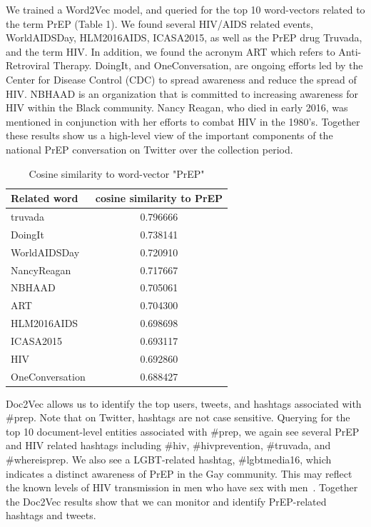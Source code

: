 \documentclass{sig-alternate-05-2015}
\begin{document}
We trained a Word2Vec model, and queried for the top 10 word-vectors related to the term PrEP (Table 1). We found several HIV/AIDS related events, WorldAIDSDay, HLM2016AIDS, ICASA2015, as well as the PrEP drug Truvada, and the term HIV. In addition, we found the acronym ART which refers to Anti-Retroviral Therapy. DoingIt, and OneConversation, are ongoing efforts led by the Center for Disease Control (CDC) to spread awareness and reduce the spread of HIV. NBHAAD is an organization that is committed to increasing awareness for HIV within the Black community. Nancy Reagan, who died in early 2016, was mentioned in conjunction with her efforts to combat HIV in the 1980's. Together these results show us a high-level view of the important components of the national PrEP conversation on Twitter over the collection period.

\begin{table}
\centering
\caption{Cosine similarity to word-vector "PrEP"}
\begin{tabular}{|l|c|} \hline
Related word & cosine similarity to PrEP\\ \hline
truvada & 0.796666\\ \hline
DoingIt & 0.738141\\ \hline
WorldAIDSDay & 0.720910\\ \hline
NancyReagan & 0.717667\\ \hline
NBHAAD & 0.705061\\ \hline
ART & 0.704300\\ \hline
HLM2016AIDS & 0.698698\\ \hline
ICASA2015 & 0.693117\\ \hline
HIV & 0.692860\\ \hline
OneConversation & 0.688427\\ \hline
\hline\end{tabular}
\end{table}

Doc2Vec allows us to identify the top users, tweets, and hashtags associated with \#prep. Note that on Twitter, hashtags are not case sensitive. Querying for the top 10 document-level entities associated with \#prep, we again see several PrEP and HIV related hashtags including \#hiv, \#hivprevention, \#truvada, and \#whereisprep. We also see a LGBT-related hashtag, \#lgbtmedia16, which indicates a distinct awareness of PrEP in the Gay community. This may reflect the known levels of HIV transmission in men who have sex with men~\cite{centers2014hiv}. Together the Doc2Vec results show that we can monitor and identify PrEP-related hashtags and tweets.
\end{document}
